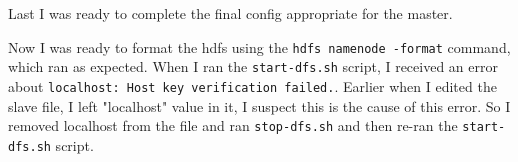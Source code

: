 \documentclass[10pt]{article}
\begin{document}
Last I was ready to complete the final config appropriate for the master. 
\par
{}%
\hfill
{}%
\par
Now I was ready to format the hdfs using the \verb|hdfs namenode -format| command, which ran as expected. When I ran the \verb|start-dfs.sh| script, I received an error about \verb|localhost: Host key verification failed.|. Earlier when I edited the slave file, I left "localhost" value in it, I suspect this is the cause of this error. So I removed localhost from the file and ran \verb|stop-dfs.sh| and then re-ran the \verb|start-dfs.sh| script.
\par
{}%
\hfill
{}%
\end{document}
